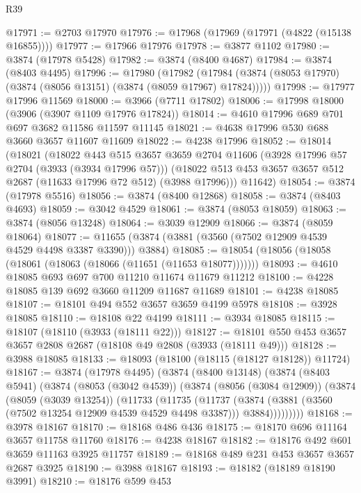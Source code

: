 \begin{lexlean}{R39}
\begin{coremodule}
@17971 := @2703 @17970
@17976 := @17968 (@17969 (@17971 (@4822 (@15138 @16855))))
@17977 := @17966 @17976
@17978 := @3877 @1102
@17980 := @3874 (@17978 @5428)
@17982 := @3874 (@8400 @4687)
@17984 := @3874 (@8403 @4495)
@17996 := @17980
    (@17982 (@17984 (@3874 (@8053 @17970) (@3874 (@8056 @13151) (@3874 (@8059 @17967) @17824)))))
@17998 := @17977 @17996 @11569
@18000 := @3966 (@7711 @17802)
@18006 := @17998 @18000 (@3906 (@3907 @1109 @17976 @17824))
@18014 := @4610 @17996 @689 @701 @697 @3682 @11586 @11597 @11145
@18021 := @4638 @17996 @530 @688 @3660 @3657 @11607 @11609
@18022 := @4238 @17996
@18052 := @18014
    (@18021
      (@18022
        @443
        @515
        @3657
        @3659
        @2704
        @11606
        (@3928 @17996 @57 @2704 (@3933 (@3934 @17996 @57)))
        (@18022 @513 @453 @3657 @3657 @512 @2687 (@11633 @17996 @72 @512) (@3988 @17996)))
      @11642)
@18054 := @3874 (@17978 @5516)
@18056 := @3874 (@8400 @12868)
@18058 := @3874 (@8403 @4693)
@18059 := @3042 @4529
@18061 := @3874 (@8053 @18059)
@18063 := @3874 (@8056 @13248)
@18064 := @3039 @12909
@18066 := @3874 (@8059 @18064)
@18077 := @11655 (@3874 (@3881 (@3560 (@7502 @12909 @4539 @4529 @4498 @3387 @3390))) @3884)
@18085 := @18054 (@18056 (@18058 (@18061 (@18063 (@18066 (@11651 (@11653 @18077)))))))
@18093 := @4610 @18085 @693 @697 @700 @11210 @11674 @11679 @11212
@18100 := @4228 @18085 @139 @692 @3660 @11209 @11687 @11689
@18101 := @4238 @18085
@18107 := @18101 @494 @552 @3657 @3659 @4199 @5978
@18108 := @3928 @18085
@18110 := @18108 @22 @4199
@18111 := @3934 @18085
@18115 := @18107 (@18110 (@3933 (@18111 @22)))
@18127 := @18101 @550 @453 @3657 @3657 @2808 @2687 (@18108 @49 @2808 (@3933 (@18111 @49)))
@18128 := @3988 @18085
@18133 := @18093 (@18100 (@18115 (@18127 @18128)) @11724)
@18167 := @3874
    (@17978 @4495)
    (@3874
      (@8400 @13148)
      (@3874
        (@8403 @5941)
        (@3874
          (@8053 (@3042 @4539))
          (@3874
            (@8056 (@3084 @12909))
            (@3874
              (@8059 (@3039 @13254))
              (@11733
                (@11735
                  (@11737
                    (@3874
                      (@3881 (@3560 (@7502 @13254 @12909 @4539 @4529 @4498 @3387)))
                      @3884)))))))))
@18168 := @3978 @18167
@18170 := @18168 @486 @436
@18175 := @18170 @696 @11164 @3657 @11758 @11760
@18176 := @4238 @18167
@18182 := @18176 @492 @601 @3659 @11163 @3925 @11757
@18189 := @18168 @489 @231 @453 @3657 @3657 @2687 @3925
@18190 := @3988 @18167
@18193 := @18182 (@18189 @18190 @3991)
@18210 := @18176
    @599
    @453

\end{coremodule}
\end{lexlean}
